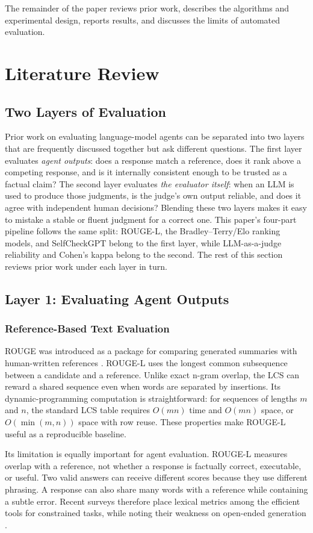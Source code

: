 \documentclass[conference]{IEEEtran}
\begin{document}
The remainder of the paper reviews prior work, describes the algorithms and experimental design, reports results, and discusses the limits of automated evaluation.

\section{Literature Review}
\subsection{Two Layers of Evaluation}
Prior work on evaluating language-model agents can be separated into two layers that are frequently discussed together but ask different questions. The first layer evaluates \emph{agent outputs}: does a response match a reference, does it rank above a competing response, and is it internally consistent enough to be trusted as a factual claim? The second layer evaluates \emph{the evaluator itself}: when an LLM is used to produce those judgments, is the judge's own output reliable, and does it agree with independent human decisions? Blending these two layers makes it easy to mistake a stable or fluent judgment for a correct one. This paper's four-part pipeline follows the same split: ROUGE-L, the Bradley--Terry/Elo ranking models, and SelfCheckGPT belong to the first layer, while LLM-as-a-judge reliability and Cohen's kappa belong to the second. The rest of this section reviews prior work under each layer in turn.

\subsection{Layer 1: Evaluating Agent Outputs}
\subsubsection{Reference-Based Text Evaluation}
ROUGE was introduced as a package for comparing generated summaries with human-written references \cite{lin2004rouge}. ROUGE-L uses the longest common subsequence between a candidate and a reference. Unlike exact n-gram overlap, the LCS can reward a shared sequence even when words are separated by insertions. Its dynamic-programming computation is straightforward: for sequences of lengths $m$ and $n$, the standard LCS table requires $O(mn)$ time and $O(mn)$ space, or $O(\min(m,n))$ space with row reuse. These properties make ROUGE-L useful as a reproducible baseline.

Its limitation is equally important for agent evaluation. ROUGE-L measures overlap with a reference, not whether a response is factually correct, executable, or useful. Two valid answers can receive different scores because they use different phrasing. A response can also share many words with a reference while containing a subtle error. Recent surveys therefore place lexical metrics among the efficient tools for constrained tasks, while noting their weakness on open-ended generation \cite{li2024generation}.
\end{document}
